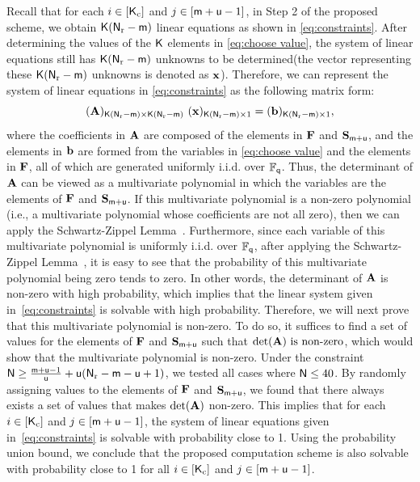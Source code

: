 \documentclass[conference,letterpaper]{IEEEtran}
\begin{document}
Recall that for each \( i \in [{\sf K}_{\rm c}] \) and \( j \in [{\sf m}+{\sf u}-1] \), in Step 2 of the proposed scheme, we obtain \( {\sf K}({\sf N}_{\rm r}-{\sf m}) \) linear equations as shown in \eqref{eq:constraints}. After determining the values of the \( {\sf K} \) elements in \eqref{eq:choose value}, the system of linear equations still has \( {\sf K}({\sf N}_{\rm r}-{\sf m}) \) unknowns to be determined(the vector representing these \( {\sf K}({\sf N}_{\rm r}-{\sf m}) \) unknowns is denoted as \( {\bf x} \)). Therefore, we can represent the system of linear equations in \eqref{eq:constraints} as the following matrix form:
\begin{equation}
({\bf A})_{{\sf K}({\sf N}_{\rm r}-{\sf m}) \times {\sf K}({\sf N}_{\rm r}-{\sf m})} \ ({\bf x})_{{\sf K}({\sf N}_{\rm r}-{\sf m}) \times 1} = ({\bf b})_{{\sf K}({\sf N}_{\rm r}-{\sf m}) \times 1}, \label{eq:matrix form}
\end{equation}
where the coefficients in ${\bf A}$ are composed of the elements in ${\bf F}$ and ${\bf S}_{{\sf m}+{\sf u}}$, and the elements in \( {\bf b} \) are formed from the variables in \eqref{eq:choose value} and the elements in ${\bf F}$, all of which are generated uniformly i.i.d. over \( \mathbb{F}_{{\sf q}} \). Thus, the determinant of ${\bf A}$ can be viewed as a multivariate polynomial in which the variables are the elements of ${\bf F}$ and ${\bf S}_{{\sf m}+{\sf u}}$.
If this multivariate polynomial is a non-zero polynomial (i.e., a multivariate polynomial whose coefficients are not all zero), then we can apply the Schwartz-Zippel Lemma~\cite{lemma1,lemma2,lemma3}. Furthermore, since each variable of this multivariate polynomial is uniformly i.i.d. over \( \mathbb{F}_{{\sf q}} \), after applying the Schwartz-Zippel Lemma~\cite{lemma1,lemma2,lemma3}, it is easy to see that the probability of this multivariate polynomial being zero tends to zero. In other words, the determinant of \( {\bf A} \) is non-zero with high probability, which implies that the linear system given in~\eqref{eq:constraints} is solvable with high probability. Therefore, we will next prove that this multivariate polynomial is non-zero. To do so, it suffices to find a set of values for the elements of ${\bf F}$ and ${\bf S}_{{\sf m}+{\sf u}}$ such that \(\text{det}({\bf A}) \text{ is non-zero}\), which would show that the multivariate polynomial is non-zero.
Under the constraint ${\sf N} \geq \frac{{\sf m} + {\sf u} - 1}{{\sf u}} + {\sf u}({\sf N}_{\rm r} - {\sf m} - {\sf u} + 1)$, we tested all cases where ${\sf N} \leq 40$. By randomly assigning values to the elements of ${\bf F}$ and ${\bf S}_{{\sf m}+{\sf u}}$, we found that there always exists a set of values that makes \(\text{det}({\bf A})\) non-zero. This implies that for each \( i \in [{\sf K}_{\rm c}] \) and \( j \in [{\sf m} + {\sf u} - 1] \), the system of linear equations given in~\eqref{eq:constraints} is solvable with probability close to 1. Using the probability union bound, we conclude that the proposed computation scheme is also solvable with probability close to 1 for all \( i \in [{\sf K}_{\rm c}] \) and \( j \in [{\sf m} + {\sf u} - 1] \).
\end{document}
